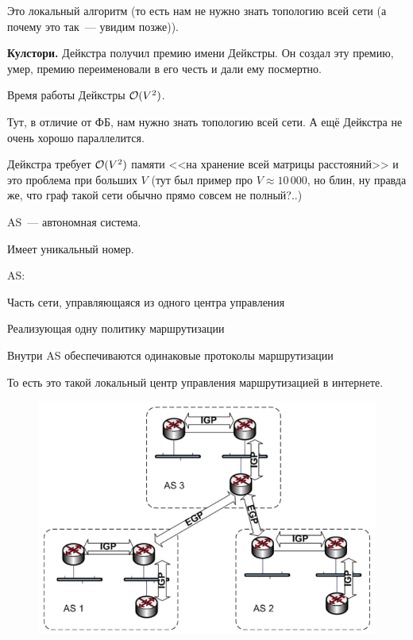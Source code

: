 Это локальный алгоритм (то есть нам не нужно знать топологию всей сети (а почему это так~--- увидим позже)).

{\bf Кулстори.} Дейкстра получил премию имени Дейкстры. Он создал эту премию, умер, премию переименовали в его честь и дали ему посмертно.

Время работы Дейкстры $\mathcal{O}(V^2)$.

Тут, в отличие от ФБ, нам нужно знать топологию всей сети. А ещё Дейкстра не очень хорошо параллелится.

Дейкстра требует $\mathcal{O}(V^2)$ памяти <<на хранение всей матрицы расстояний>> и это проблема при больших $V$ (тут был пример про $V\approx 10\,000$, но блин, ну правда же, что граф такой сети обычно прямо совсем не полный?..) 


AS~--- автономная система.

Имеет уникальный номер.

AS:
\begin{MyItemize}
    \item Часть сети, управляющаяся из одного центра управления
    \item Реализующая одну политику маршрутизации
    \item Внутри AS обеспечиваются одинаковые протоколы маршрутизации
\end{MyItemize}

То есть это такой локальный центр управления маршрутизацией в интернете.

\begin{figure}[H]
  \centering
  \includegraphics[width=15cm]{images/04/04}
\end{figure}

